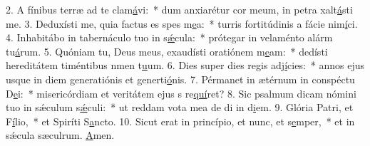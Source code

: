 2. A fínibus terræ ad te clam\uline{á}vi:~* dum anxiarétur cor meum, in petra xalt\uline{á}sti me.
3. Deduxísti me, quia factus es spes m\uline{e}a:~* turris fortitúdinis a fácie nim\uline{í}ci.
4. Inhabitábo in tabernáculo tuo in s\uline{ǽ}cula:~* prótegar in velaménto alárm tu\uline{á}rum.
5. Quóniam tu, Deus meus, exaudísti oratiónem m\uline{e}am:~* dedísti hereditátem timéntibus nmen t\uline{u}um.
6. Dies super dies regis adj\uline{í}cies:~* annos ejus usque in diem generatiónis et generti\uline{ó}nis.
7. Pérmanet in ætérnum in conspéctu D\uline{e}i:~* misericórdiam et veritátem ejus s re\uline{quí}ret?
8. Sic psalmum dicam nómini tuo in sǽculum s\uline{ǽ}culi:~* ut reddam vota mea de di in d\uline{i}em.
9. Glória Patri, et F\uline{í}lio,~* et Spiríti S\uline{a}ncto.
10. Sicut erat in princípio, et nunc, et s\uline{e}mper,~* et in sǽcula sæculrum. \uline{A}men.
